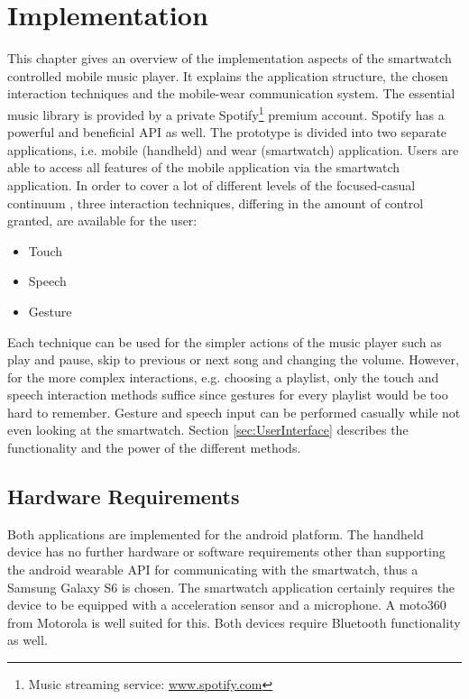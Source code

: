 \chapter{Implementation}\label{ch:implementation}

This chapter gives an overview of the implementation aspects of the smartwatch controlled mobile music player. It explains the application structure, the chosen interaction techniques and the mobile-wear communication system.
The essential music library is provided by a private Spotify\footnote{Music streaming service: \url{www.spotify.com}} premium account. Spotify has a powerful and beneficial \ac{API} as well. The prototype is divided into two separate applications, i.e. mobile (handheld) and wear (smartwatch) application. Users are able to access all features of the mobile application via the smartwatch application. In order to cover a lot of different levels of the focused-casual continuum \cite{pohl2013focused}, three interaction techniques, differing in the amount of control granted, are available for the user:
\begin{itemize}
\item{Touch}
\item{Speech}
\item{Gesture}
\end{itemize}
Each technique can be used for the simpler actions of the music player such as play and pause, skip to previous or next song and changing the volume. However, for the more complex interactions, e.g. choosing a playlist, only the touch and speech interaction methods suffice since gestures for every playlist would be too hard to remember. Gesture and speech input can be performed casually while not even looking at the smartwatch. Section \ref{sec:UserInterface} describes the functionality and the power of the different methods.

\section{Hardware Requirements}\label{sec:hardwarerequirements}
Both applications are implemented for the android platform. The handheld device has no further hardware or software requirements other than supporting the android wearable \ac{API} for communicating with the smartwatch, thus a Samsung Galaxy S6 is chosen. The smartwatch application certainly requires the device to be equipped with a acceleration sensor and a microphone. A moto360 from Motorola is well suited for this. Both devices require Bluetooth functionality as well.

